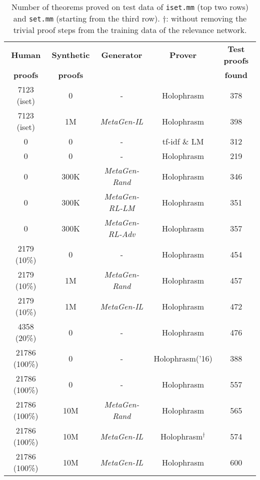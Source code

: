 \documentclass{article}
\begin{document}
\begin{table*}[t]
\caption{Number of theorems proved on test data of \texttt{iset.mm} (top two rows) and \texttt{set.mm} (starting from the third row).
$\dagger$: without removing the trivial proof steps from the training data of the relevance network.}
\label{table:prover}
\begin{center}
\begin{small}
\begin{sc}
\begin{tabular}{c c c c c}
\toprule
\multicolumn{1}{c}{\bf Human  } 
&\multicolumn{1}{c}{\bf Synthetic  } 
&\multicolumn{1}{c}{\bf Generator}
&\multicolumn{1}{c}{\bf Prover}
&\multicolumn{1}{c}{\bf Test proofs }
\\
\multicolumn{1}{c}{\bf  proofs } 
&\multicolumn{1}{c}{\bf  proofs } 
&\multicolumn{1}{c}{\bf }
&\multicolumn{1}{c}{\bf }
&\multicolumn{1}{c}{\bf found}
\\ \midrule
7123 (iset)& 0 & - & Holophrasm & 378 \\
7123 (iset)& 1M & \textit{MetaGen-IL}& Holophrasm & 398  \\
\midrule
0 & 0&- & tf-idf $\&$ LM & 312 \\
0 & 0&- &Holophrasm & 219 \\
0 & 300K & \textit{MetaGen-Rand} & Holophrasm & 346 \\
0 & 300K &\textit{MetaGen-RL-LM}& Holophrasm & 351  \\ 
0 & 300K &\textit{MetaGen-RL-Adv}& Holophrasm & 357  \\ 
\midrule
2179 (10\%) & 0 & -&  Holophrasm& 454  \\
2179 (10\%) & 1M&\textit{MetaGen-Rand}&Holophrasm & 457 \\
2179 (10\%) & 1M&\textit{MetaGen-IL}& Holophrasm& 472  \\ 
4358 (20\%) & 0 & -&  Holophrasm& 476  \\
\midrule
21786 (100\%)&0 & -& Holophrasm('16) & 388 \\
21786 (100\%)&0 & -&  Holophrasm& 557  \\
21786 (100\%)& 10M & \textit{MetaGen-Rand}& Holophrasm & 565 \\
21786 (100\%)& 10M & \textit{MetaGen-IL}& Holophrasm$^\dagger$ & 574  \\
21786 (100\%)& 10M & \textit{MetaGen-IL}& Holophrasm & 600  \\
\bottomrule
\end{tabular}
\end{sc}
\end{small}
\end{center}
\vskip -0.2in
\end{table*}
\end{document}

